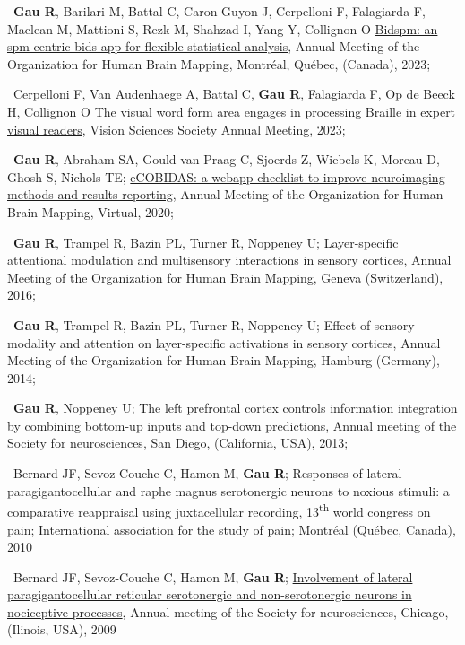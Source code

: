 \textbullet~\textbf{Gau R}, Barilari M, Battal C, Caron-Guyon J, Cerpelloni F, Falagiarda F, Maclean M, Mattioni S, Rezk M, Shahzad I, Yang Y, Collignon O
\href{https://github.com/cpp-lln-lab/bidspm_poster_ohbm_2023/blob/main/abstract_ohbm_2023_bidspm.pdf}{Bidspm: an spm-centric bids app for flexible statistical analysis},
Annual Meeting of the Organization for Human Brain Mapping, Montréal, Québec, (Canada),
2023;

\textbullet~Cerpelloni F, Van Audenhaege A, Battal C, \textbf{Gau R}, Falagiarda F, Op de Beeck H, Collignon O
\href{https://jov.arvojournals.org/article.aspx?articleid=2791520}{The visual word form area engages in processing Braille in expert visual readers},
Vision Sciences Society Annual Meeting,
2023;

\textbullet~\textbf{Gau R}, Abraham SA, Gould van Praag C, Sjoerds Z, Wiebels K, Moreau D, Ghosh S, Nichols TE;
\href{https://osf.io/k8pe6/}{eCOBIDAS: a webapp checklist to improve neuroimaging methods and results reporting},
Annual Meeting of the Organization for Human Brain Mapping, Virtual,
2020;

\textbullet~\textbf{Gau R}, Trampel R, Bazin PL, Turner R, Noppeney U;
Layer-specific attentional modulation and multisensory interactions in sensory cortices,
Annual Meeting of the Organization for Human Brain Mapping, Geneva (Switzerland),
2016;

\textbullet~\textbf{Gau R}, Trampel R, Bazin PL, Turner R, Noppeney U;
Effect of sensory modality and attention on layer-specific activations in sensory cortices,
Annual Meeting of the Organization for Human Brain Mapping, Hamburg (Germany),
2014;

\textbullet~\textbf{Gau R}, Noppeney U; The left prefrontal cortex controls information integration
by combining bottom-up inputs and top-down predictions,
Annual meeting of the Society for neurosciences,
San Diego, (California, USA),
2013;

\textbullet~Bernard JF, Sevoz-Couche C, Hamon M, \textbf{Gau R};
Responses of lateral paragigantocellular and raphe magnus serotonergic neurons to noxious stimuli:
a comparative reappraisal using juxtacellular recording,
13\textsuperscript{th} world congress on pain; International association for the study of pain;
Montréal (Québec, Canada),
2010

\textbullet~Bernard JF, Sevoz-Couche C, Hamon M, \textbf{Gau R};
\href{https://osf.io/efqub/}{Involvement of lateral paragigantocellular reticular serotonergic
and non-serotonergic neurons in nociceptive processes},
Annual meeting of the Society for neurosciences,
Chicago, (Ilinois, USA),
2009

